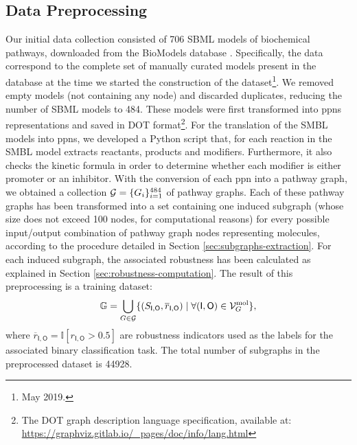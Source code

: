 \subsection{Data Preprocessing}\label{subsec:data-collection}
Our initial data collection consisted of 706 SBML models of biochemical pathways, downloaded from the BioModels database \cite{le2006biomodels}. Specifically, the data correspond to the complete set of manually curated models present in the database at the time we started the construction of the dataset\footnote{May 2019.}. We removed empty models (not containing any node) and discarded duplicates, reducing the number of SBML models to 484. These models were first transformed into \glspl{ppn} representations and saved in DOT format\footnote{The DOT graph description language specification, available at: \url{https://graphviz.gitlab.io/_pages/doc/info/lang.html}}. For the translation of the SMBL models into \glspl{ppn}, we developed a Python script that, for each reaction in the SMBL model extracts reactants, products and modifiers. Furthermore, it also checks the kinetic formula in order to determine whether each modifier is either promoter or an inhibitor. With the conversion of each \gls{ppn} into a pathway graph, we obtained a collection $\Cal{G} = \Set{G_i}_{i=1}^{484}$ of pathway graphs. Each of these pathway graphs has been transformed into a set containing one induced subgraph (whose size does not exceed 100 nodes, for computational reasons) for every possible input/output combination of pathway graph nodes representing molecules, according to the procedure detailed in Section \ref{sec:subgraphs-extraction}. For each induced subgraph, the associated robustness has been calculated as explained in Section \ref{sec:robustness-computation}. The result of this preprocessing is a training dataset:
$$\mathbb{G} = \bigcup\limits_{G \in \Cal{G}} \Set{(S_{\mathsf{I},\mathsf{O}}, \overline{r}_{{\mathsf{I},\mathsf{O}}}) \mid \forall (\mathsf{I},\mathsf{O}) \in \Cal{V}_{G}^{\Fun{mol}}},$$
where $\overline{r}_{\mathsf{I}, \mathsf{O}} = \mathbb{I}[r_{\mathsf{I}, \mathsf{O}} > 0.5]$ are robustness indicators used as the labels for the associated binary classification task. The total number of subgraphs in the preprocessed dataset is 44928.

